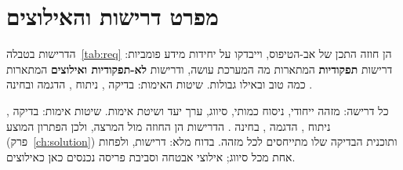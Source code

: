 \section{מפרט דרישות והאילוצים}\label{sec:requirements}
הדרישות בטבלה~\ref{tab:req} הן חוזה התכן של אב-הטיפוס, וייבדקו על יחידות מידע פומביות: דרישות \textbf{תפקודיות}  המתארות מה המערכת עושה,
ודרישות \textbf{לא-תפקודיות ואילוצים}  המתארות כמה טוב ובאילו גבולות. שיטות האימות: בדיקה ,
ניתוח , הדגמה  ובחינה .
\begin{pcguide}
כל דרישה: מזהה ייחודי, ניסוח כמותי, סיווג, ערך יעד ושיטת אימות. שיטות אימות:
בדיקה , ניתוח , הדגמה , בחינה . הדרישות הן החוזה מול המרצה,
ולכן הפתרון המוצע (פרק~\ref{ch:solution}) ותוכנית הבדיקה שלו מתייחסים לכל מזהה.
בדוח מלא:  דרישות, ולפחות אחת מכל סיווג; אילוצי אבטחה וסביבת פריסה נכנסים כאן כאילוצים.
\end{pcguide}
